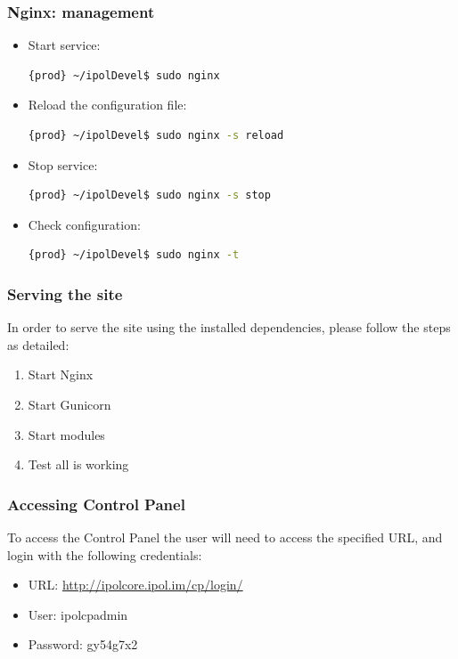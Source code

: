 \subsubsection{Nginx: management}

\begin{itemize}
\item Start service:
\begin{lstlisting}[language=Bash]
{prod} ~/ipolDevel$ sudo nginx
\end{lstlisting}
\item Reload the configuration file:
\begin{lstlisting}[language=Bash]
{prod} ~/ipolDevel$ sudo nginx -s reload
\end{lstlisting}
\item Stop service:
\begin{lstlisting}[language=Bash]
{prod} ~/ipolDevel$ sudo nginx -s stop
\end{lstlisting}
\item Check configuration:
\begin{lstlisting}[language=Bash]
{prod} ~/ipolDevel$ sudo nginx -t
\end{lstlisting}
\end{itemize}

\subsubsection{Serving the site}
In order to serve the site using the installed dependencies, please follow the steps as detailed:
\begin{enumerate}
\item Start Nginx
\item Start Gunicorn
\item Start modules
\item Test all is working
\end{enumerate}

\subsubsection{Accessing Control Panel}
To access the Control Panel the user will need to access the specified URL, and login with the following credentials:

\begin{itemize}
\item URL: \url{http://ipolcore.ipol.im/cp/login/}

\item User: ipolcpadmin

\item Password: gy54g7x2 
\end{itemize}
